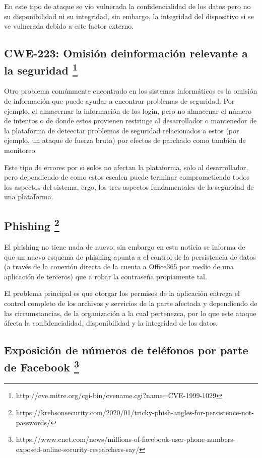 \documentclass[11pt]{utalcaDoc}
\begin{document}
En este tipo de ataque se vio vulnerada la confidencialidad de los datos pero no su disponibilidad ni su integridad, sin embargo, la integridad del dispositivo si se ve vulnerada debido a este factor externo.


\subsection{
    CWE-223: Omisión deinformación relevante a la seguridad
    \footnote{ http://cve.mitre.org/cgi-bin/cvename.cgi?name=CVE-1999-1029 }
    }

Otro problema comúnmente encontrado en los sistemas informáticos es la omisión de información que puede ayudar a encontrar problemas de seguridad. Por ejemplo, el almacernar la información de los login, pero no almacenar el número de intentos o de donde estos provienen restringe al desarrollador o mantenedor de la plataforma de deteectar problemas de seguridad relacionados a estos (por ejemplo, un ataque de fuerza bruta) por efectos de parchado como también de monitoreo.

Este tipo de errores por si solos no afectan la plataforma, solo al desarrollador, pero dependiendo de como estos escalen puede terminar comprometiendo todos los aspectos del sistema, ergo, los tres aspectos fundamentales de la seguridad de una plataforma.




\subsection{
    Phishing
    \footnote{ https://krebsonsecurity.com/2020/01/tricky-phish-angles-for-persistence-not-passwords/ }
}

El phishing no tiene nada de nuevo, sin embargo en esta noticia se informa de que un nuevo esquema de phishing apunta a el control de la persistencia de datos (a través de la conexión directa de la cuenta a Office365 por medio de una aplicación de terceros) que a robar la contraseña propiamente tal. 

El problema principal es que otorgar los permisos de la aplicación entrega el control completo de los archivos y servicios de la parte afectada y dependiendo de las circumstancias, de la organización a la cual pertenezca, por lo que este ataque áfecta la confidencialidad, disponibilidad y la integridad de los datos.


\subsection{
    Exposición de números de teléfonos por parte de Facebook
    \footnote{ https://www.cnet.com/news/millions-of-facebook-user-phone-numbers-exposed-online-security-researchers-say/ }
}
\end{document}
